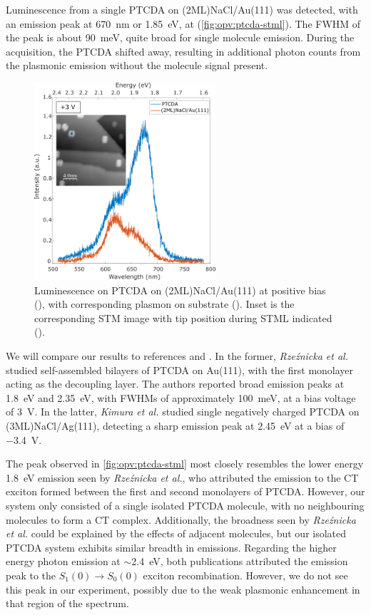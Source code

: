 Luminescence from a single PTCDA on (2ML)NaCl/Au(111) was detected, with an emission peak at \SI{670}{nm} or \SI{1.85}{eV}, at  (\autoref{fig:opv:ptcda-stml}). The \ac{FWHM} of the peak is about \SI{90}{meV}, quite broad for single molecule emission. During the acquisition, the PTCDA shifted away, resulting in additional photon counts from the plasmonic emission without the molecule signal present.


\begin{figure} [H]
    \centering
        \includegraphics[width=0.6\textwidth]{pictures/ptcda_+ve_emission_inset.png}
    \caption{Luminescence on PTCDA on (2ML)NaCl/Au(111) at positive bias (), with corresponding plasmon on substrate (). Inset is the corresponding STM image with tip position during STML indicated (). }
    \label{fig:opv:ptcda-stml}
\end{figure}

We will compare our results to references \citep{Rzeznicka2011} and \citep{Kimura2019}. In the former, \textit{Rze\'znicka et al.} studied self-assembled bilayers of PTCDA on Au(111), with the first monolayer acting as the decoupling layer. The authors reported broad emission peaks at \SI{1.8}{eV} and \SI{2.35}{eV}, with \acp{FWHM} of approximately \SI{100}{meV}, at a bias voltage of \SI{3}{V}. In the latter, \textit{Kimura et al.} studied single negatively charged PTCDA on (3ML)NaCl/Ag(111), detecting a sharp emission peak at \SI{2.45}{eV} at a bias of \SI{-3.4}{V}. 

The peak observed in \autoref{fig:opv:ptcda-stml} most closely resembles the lower energy \SI{1.8}{eV} emission seen by \textit{Rze\'znicka et al.}, who attributed the emission to the \ac{CT} exciton formed between the first and second monolayers of PTCDA. However, our system only consisted of a single isolated PTCDA molecule, with no neighbouring molecules to form a \ac{CT} complex. Additionally, the broadness seen by \textit{Rze\'znicka et al.} could be explained by the effects of adjacent molecules, but our isolated PTCDA system exhibits similar breadth in emissions. Regarding the higher energy photon emission at $\sim$\SI{2.4}{eV}, both publications attributed the emission peak to the $S_1(0) \rightarrow S_0(0)$ exciton recombination. However, we do not see this peak in our experiment, possibly due to the weak plasmonic enhancement in that region of the spectrum.

